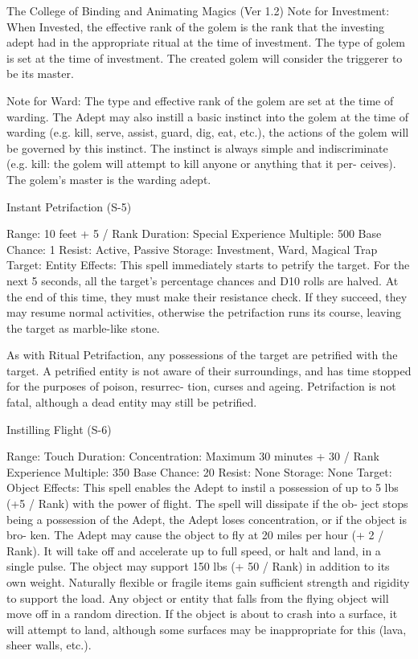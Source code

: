 \begin{Chapter}{The College of Binding and Animating Magics (Ver 1.2)}
Note  for  Investment:  When  Invested,  the  effective 
rank  of  the  golem  is  the  rank  that  the  investing 
adept  had  in  the  appropriate  ritual  at  the  time  of 
investment. The type of golem is set at the time of 
investment.  The  created  golem  will  consider  the 
triggerer to be its master. 

Note for Ward:  The type and effective rank of the 
golem  are  set  at  the  time  of  warding.  The  Adept 
may  also  instill  a  basic  instinct  into  the  golem  at 
the  time  of  warding  (e.g.  kill,  serve,  assist,  guard, 
dig,  eat,  etc.),  the  actions  of  the  golem  will  be 
governed  by  this  instinct.  The  instinct  is  always 
simple and indiscriminate (e.g. kill: the golem will 
attempt  to  kill  anyone  or  anything  that  it  per-
ceives). The golem’s master is the warding adept. 

Instant Petrifaction (S-5) 

Range: 10 feet + 5 / Rank 
Duration: Special 
Experience Multiple: 500 
Base Chance: 1%
Resist: Active, Passive 
Storage: Investment, Ward, Magical Trap 
Target: Entity 
Effects: This spell immediately starts to petrify the 
target.  For  the  next 5  seconds, all  the  target’s  percentage  chances  and  D10  rolls  are  halved.  At  the 
end  of  this  time,  they  must  make  their  resistance 
check.  If  they  succeed,  they  may  resume  normal 
activities, otherwise the petrifaction runs its course, 
leaving the target as marble-like stone. 

As with Ritual Petrifaction, any possessions of the 
target  are  petrified  with  the  target.  A  petrified 
entity  is  not  aware  of  their  surroundings,  and  has 
time  stopped  for  the  purposes  of  poison,  resurrec-
tion,  curses  and  ageing.  Petrifaction  is  not  fatal, 
although a dead entity may still be petrified. 

Instilling Flight (S-6) 

Range: Touch 
Duration:  Concentration:  Maximum  30  minutes  + 
30 / Rank 
Experience Multiple: 350 
Base Chance: 20%
Resist: None 
Storage: None 
Target: Object 
Effects:  This  spell  enables  the  Adept  to  instil  a 
possession  of  up  to  5  lbs  (+5  /  Rank)  with  the 
power  of  flight.  The  spell  will  dissipate  if  the  ob-
ject  stops  being  a  possession  of  the  Adept,  the 
Adept  loses  concentration,  or  if  the  object  is  bro-
ken.  The  Adept  may  cause  the  object  to  fly  at  20 
miles  per  hour  (+  2  /  Rank).  It  will  take  off  and 
accelerate  up  to  full  speed,  or  halt  and  land,  in  a 
single pulse. The object may support 150 lbs (+ 50 
/  Rank)  in  addition  to  its  own  weight.  Naturally 
flexible or fragile items gain sufficient strength and 
rigidity  to  support  the  load.  Any  object  or  entity 
that falls from the flying object  will  move off in a 
random  direction.  If  the  object  is  about  to  crash 
into  a  surface,  it  will  attempt  to  land,  although 
some  surfaces  may  be  inappropriate  for  this  (lava, 
sheer walls, etc.). 


\end{Chapter}
